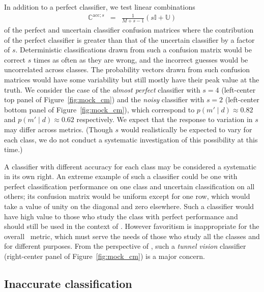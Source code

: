 In addition to a perfect classifier, we test linear combinations
\begin{eqnarray}
  \label{eq:lincomb}
  \mathbb{C}^{\mathrm{acc}; s} &=& \frac{1}{M+s-1} \left(s\mathbb{I} + \mathbb{U}\right)
\end{eqnarray}
of the perfect and uncertain classifier confusion matrices where the contribution of the perfect classifier is greater than that of the uncertain classifier by a factor of $s$.
Deterministic classifications drawn from such a confusion matrix would be correct $s$ times as often as they are wrong, and the incorrect guesses would be uncorrelated across classes.
The probability vectors drawn from such confusion matrices would have some variability but still mostly have their peak value at the truth.
We consider the case of the \textit{almost perfect} classifier with $s=4$ (left-center top panel of Figure~\ref{fig:mock_cm}) and the \textit{noisy} classifier with $s=2$ (left-center bottom panel of Figure~\ref{fig:mock_cm}), which correspond to $p(m' \mid d)\approx0.82$ and $p(m' \mid d)\approx0.62$ respectively.
We expect that the response to variation in $s$ may differ across metrics.
(Though $s$ would realistically be expected to vary for each class, we do not conduct a systematic investigation of this possibility at this time.)

A classifier with different accuracy for each class may be considered a systematic in its own right.
An extreme example of such a classifier could be one with perfect classification performance on one class and uncertain classification on all others; its confusion matrix would be uniform except for one row, which would take a value of unity on the diagonal and zero elsewhere.
Such a classifier would have high value to those who study the class with perfect performance and should still be used in the context of \lsst.
However favoritism is inappropriate for the overall \plasticc\ metric, which must serve the needs of those who study all the classes and for different purposes.
From the perspective of \plasticc, such a \textit{tunnel vision} classifier (right-center panel of Figure~\ref{fig:mock_cm}) is a major concern.

\subsection{Inaccurate classification}
\label{sec:inaccuratedata}

